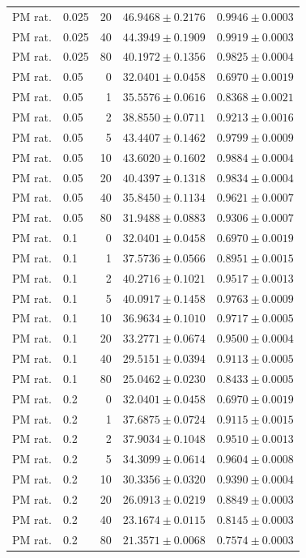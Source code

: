 \begin{longtable}{llrll}
PM rat. & 0.025 & 20 & $46.9468 \pm 0.2176$ & $0.9946 \pm 0.0003$ \\
PM rat. & 0.025 & 40 & $44.3949 \pm 0.1909$ & $0.9919 \pm 0.0003$ \\
PM rat. & 0.025 & 80 & $40.1972 \pm 0.1356$ & $0.9825 \pm 0.0004$ \\
PM rat. & 0.05 & 0 & $32.0401 \pm 0.0458$ & $0.6970 \pm 0.0019$ \\
PM rat. & 0.05 & 1 & $35.5576 \pm 0.0616$ & $0.8368 \pm 0.0021$ \\
PM rat. & 0.05 & 2 & $38.8550 \pm 0.0711$ & $0.9213 \pm 0.0016$ \\
PM rat. & 0.05 & 5 & $43.4407 \pm 0.1462$ & $0.9799 \pm 0.0009$ \\
PM rat. & 0.05 & 10 & $43.6020 \pm 0.1602$ & $0.9884 \pm 0.0004$ \\
PM rat. & 0.05 & 20 & $40.4397 \pm 0.1318$ & $0.9834 \pm 0.0004$ \\
PM rat. & 0.05 & 40 & $35.8450 \pm 0.1134$ & $0.9621 \pm 0.0007$ \\
PM rat. & 0.05 & 80 & $31.9488 \pm 0.0883$ & $0.9306 \pm 0.0007$ \\
PM rat. & 0.1 & 0 & $32.0401 \pm 0.0458$ & $0.6970 \pm 0.0019$ \\
PM rat. & 0.1 & 1 & $37.5736 \pm 0.0566$ & $0.8951 \pm 0.0015$ \\
PM rat. & 0.1 & 2 & $40.2716 \pm 0.1021$ & $0.9517 \pm 0.0013$ \\
PM rat. & 0.1 & 5 & $40.0917 \pm 0.1458$ & $0.9763 \pm 0.0009$ \\
PM rat. & 0.1 & 10 & $36.9634 \pm 0.1010$ & $0.9717 \pm 0.0005$ \\
PM rat. & 0.1 & 20 & $33.2771 \pm 0.0674$ & $0.9500 \pm 0.0004$ \\
PM rat. & 0.1 & 40 & $29.5151 \pm 0.0394$ & $0.9113 \pm 0.0005$ \\
PM rat. & 0.1 & 80 & $25.0462 \pm 0.0230$ & $0.8433 \pm 0.0005$ \\
PM rat. & 0.2 & 0 & $32.0401 \pm 0.0458$ & $0.6970 \pm 0.0019$ \\
PM rat. & 0.2 & 1 & $37.6875 \pm 0.0724$ & $0.9115 \pm 0.0015$ \\
PM rat. & 0.2 & 2 & $37.9034 \pm 0.1048$ & $0.9510 \pm 0.0013$ \\
PM rat. & 0.2 & 5 & $34.3099 \pm 0.0614$ & $0.9604 \pm 0.0008$ \\
PM rat. & 0.2 & 10 & $30.3356 \pm 0.0320$ & $0.9390 \pm 0.0004$ \\
PM rat. & 0.2 & 20 & $26.0913 \pm 0.0219$ & $0.8849 \pm 0.0003$ \\
PM rat. & 0.2 & 40 & $23.1674 \pm 0.0115$ & $0.8145 \pm 0.0003$ \\
PM rat. & 0.2 & 80 & $21.3571 \pm 0.0068$ & $0.7574 \pm 0.0003$ \\
\end{longtable}

